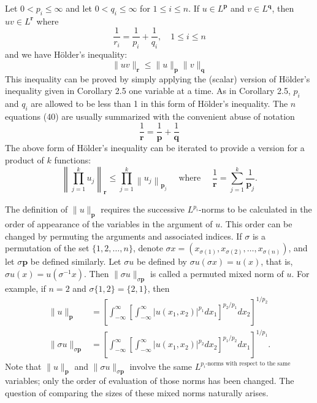 \begin{para}
  Let $0<p_i \leq \infty$ and let $0<q_i \leq \infty$ for $1 \leq i \leq n$. If $u \in L^{\mathbf{p}}$ and $v \in L^{\mathbf{q}}$, then $u v \in L^{\mathbf{r}}$ where
  \[
  \frac{1}{r_i}=\frac{1}{p_i}+\frac{1}{q_i}, \quad 1 \leq i \leq n
  \]
  and we have Hölder's inequality:
  \[
  \|u v\|_{\mathbf{r}} \leq\|u\|_{\mathbf{p}}\|v\|_{\mathbf{q}}
  \]
  This inequality can be proved by simply applying the (scalar) version of Hölder's inequality given in Corollary 2.5 one variable at a time. As in Corollary 2.5, $p_i$ and $q_i$ are allowed to be less than 1 in this form of Hölder's inequality. The $n$ equations (40) are usually summarized with the convenient abuse of notation
  \[
  \frac{1}{\mathbf{r}}=\frac{1}{\mathbf{p}}+\frac{1}{\mathbf{q}}
  \]
  The above form of Hölder's inequality can be iterated to provide a version for a product of $k$ functions:
  \[
  \left\|\prod_{j=1}^k u_j\right\|_{\mathbf{r}} \leq \prod_{j=1}^k\left\|u_j\right\|_{\mathbf{p}_j} \quad \text { where } \quad \frac{1}{\mathbf{r}}=\sum_{j=1}^k \frac{1}{\mathbf{p}_j} .
  \]
\end{para}


\begin{para}
  The definition of $\|u\|_{\mathbf{p}}$ requires the successive $L^{p_i}$-norms to be calculated in the order of appearance of the variables in the argument of $u$. This order can be changed by permuting the arguments and associated indices. If $\sigma$ is a permutation of the set $\{1,2, \ldots, n\}$, denote $\sigma x=\left(x_{\sigma(1)}, x_{\sigma(2)}, \ldots, x_{\sigma(n)}\right)$, and let $\sigma \mathbf{p}$ be defined similarly. Let $\sigma u$ be defined by $\sigma u(\sigma x)=u(x)$, that is, $\sigma u(x)=u\left(\sigma^{-1} x\right)$. Then $\|\sigma u\|_{\sigma \mathbf{p}}$ is called a permuted mixed norm of $u$. For example, if $n=2$ and $\sigma\{1,2\}=\{2,1\}$, then
  \[
  \begin{aligned}
  \|u\|_{\mathbf{p}} & =\left[\int_{-\infty}^{\infty}\left[\int_{-\infty}^{\infty}\left|u\left(x_1, x_2\right)\right|^{p_1} d x_1\right]^{p_2 / p_1} d x_2\right]^{1 / p_2} \\
  \|\sigma u\|_{\sigma \mathbf{p}} & =\left[\int_{-\infty}^{\infty}\left[\int_{-\infty}^{\infty}\left|u\left(x_1, x_2\right)\right|^{p_2} d x_2\right]^{p_1 / p_2} d x_1\right]^{1 / p_1} .
  \end{aligned}
  \]
  Note that $\|u\|_{\mathbf{p}}$ and $\|\sigma u\|_{\sigma \mathbf{p}}$ involve the same $L^{p_i \text {-norms with respect to the same }}$ variables; only the order of evaluation of those norms has been changed. The question of comparing the sizes of these mixed norms naturally arises.
\end{para}


